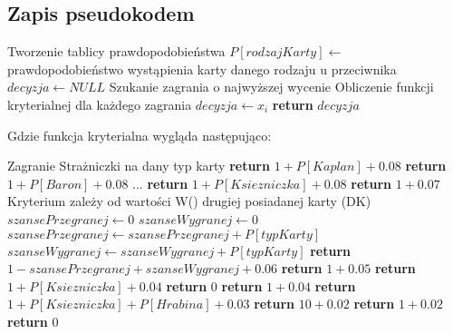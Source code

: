 \subsection{Zapis pseudokodem}
\begin{algorithmic}[1]
		 \Comment Tworzenie tablicy prawdopodobieństwa
			\State $P[rodzajKarty] \gets$  prawdopodobieństwo wystąpienia karty danego rodzaju u przeciwnika	
		\EndFor
		\State $ decyzja \gets NULL$ \Comment Szukanie zagrania o najwyższej wycenie
		 \Comment Obliczenie funkcji kryterialnej dla każdego zagrania
					\State $decyzja \gets x_i$
				\EndIf
		\EndFor		
		\State \textbf{return} $decyzja$
	\EndFunction
\end{algorithmic}

Gdzie funkcja kryterialna wygląda następująco:
\begin{algorithmic}[1]
			 \Comment Zagranie Strażniczki na dany typ karty
				\State \textbf{return} $ 1 + P[Kaplan] + 0.08 $
			\EndCase
				\State \textbf{return} $ 1 + P[Baron]  + 0.08 $
			\EndCase
			\State ...
				\State \textbf{return} $ 1 + P[Ksiezniczka]  + 0.08 $
			\EndCase
				\State \textbf{return} $ 1 + 0.07 $
			\EndCase
				\Comment Kryterium zależy od wartości W() drugiej posiadanej karty (DK)
				\State $ szansePrzegranej \gets 0$ 
				\State $ szanseWygranej \gets 0$ 
						\State $szansePrzegranej \gets szansePrzegranej + P[typKarty]$ 
						\State $szanseWygranej \gets szanseWygranej + P[typKarty]$ 
					\EndIf
				\EndFor
				\State \textbf{return} $ 1 - szansePrzegranej + szanseWygranej + 0.06 $
			\EndCase
				\State \textbf{return} $ 1 + 0.05 $
			\EndCase
				\State \textbf{return} $ 1 + P[Ksiezniczka] + 0.04 $
			\EndCase
					\State \textbf{return} $ 0 $
				\Else
					\State \textbf{return} $ 1 + 0.04 $
				\EndIf
			\EndCase
				\State \textbf{return} $ 1 + P[Ksiezniczka] + P[Hrabina] + 0.03 $
			\EndCase
				\State \textbf{return} $ 10 + 0.02 $
			\EndCase
				\State \textbf{return} $ 1 + 0.02 $
			\EndCase
				\State \textbf{return} $ 0 $
			\EndCase
		\EndSwitch
	\EndFunction
\end{algorithmic}


